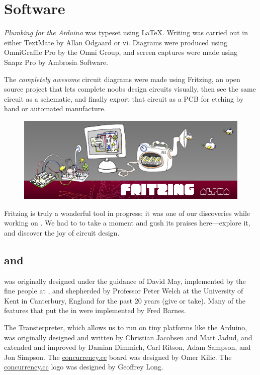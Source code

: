 \section{Software}
{\em Plumbing for the Arduino} was typeset using \LaTeX. Writing was carried out in either TextMate by Allan Odgaard or vi. Diagrams were produced using OmniGraffle Pro by the Omni Group, and screen captures were made using Snapz Pro by Ambrosia Software. 

The {\em completely awesome} circuit diagrams were made using Fritzing, an open source project that lets complete noobs design circuits visually, then see the same circuit as a schematic, and finally export that circuit as a PCB for etching by hand or automated manufacture. 

	\begin{figure}[h!]
	  \begin{center}
	    \includegraphics[width=0.9\linewidth]{images/20100110-frizing-splash-screen}
	  \end{center}
	\end{figure}
	
Fritzing is truly a wonderful tool in progress; it was one of our discoveries while working on \plumbing. We had to to take a moment and gush its praises here---explore it, and discover the joy of circuit design.

\subsection{\occam and \plumbing}

\occam was originally designed under the guidance of David May, implemented by the fine people at \inmos, and shepherded by Professor Peter Welch at the University of Kent in Canterbury, England for the past 20 years (give or take). Many of the features that put the \mypi\xspace in \occam were implemented by Fred Barnes. 

The Transterpreter, which allows us to run \occam on tiny platforms like the Arduino, was originally designed and written by Christian Jacobsen and Matt Jadud, and extended and improved by Damian Dimmich, Carl Ritson, Adam Sampson, and Jon Simpson. The \url{concurrency.cc} board was designed by Omer Kilic. The \url{concurrency.cc} logo was designed by Geoffrey Long.

